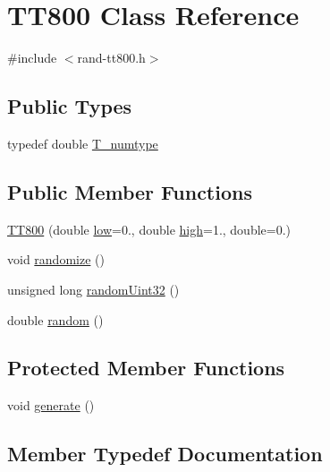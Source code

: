 \hypertarget{classTT800}{}\section{T\+T800 Class Reference}
\label{classTT800}


{\ttfamily \#include $<$rand-\/tt800.\+h$>$}

\subsection*{Public Types}
\begin{DoxyCompactItemize}
\item 
typedef double \hyperlink{classTT800_a950711e6ab4f527c9dab0367d70afbbd}{T\+\_\+numtype}
\end{DoxyCompactItemize}
\subsection*{Public Member Functions}
\begin{DoxyCompactItemize}
\item 
\hyperlink{classTT800_ab118d03ad53ee001db8dddc54f230c0b}{T\+T800} (double \hyperlink{constants_8h_a2f13f92cd23d69a695f629d173e191b7}{low}=0., double \hyperlink{constants_8h_ae74c9011680d5f172ff82efa9c482283}{high}=1., double=0.)
\item 
void \hyperlink{classTT800_af3585e927714dcc8f6b28635ed64546b}{randomize} ()
\item 
unsigned long \hyperlink{classTT800_a344d896ee88ab49f489875ecd04fc8b6}{random\+Uint32} ()
\item 
double \hyperlink{classTT800_a11166195e15b9a03607430ad3ed98d73}{random} ()
\end{DoxyCompactItemize}
\subsection*{Protected Member Functions}
\begin{DoxyCompactItemize}
\item 
void \hyperlink{classTT800_a0df537eafc530cd5f05a41829e22c212}{generate} ()
\end{DoxyCompactItemize}


\subsection{Member Typedef Documentation}
\hypertarget{classTT800_a950711e6ab4f527c9dab0367d70afbbd}{}
